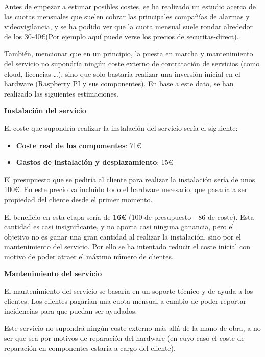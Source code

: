 Antes de empezar a estimar posibles costes, se ha realizado un estudio acerca de las cuotas mensuales que suelen cobrar las principales compañías de alarmas y videovigilancia, y se ha podido ver que la cuota mensual suele rondar alrededor de los 30-40\euro (Por ejemplo aquí puede verse los \href{https://www.comparaiso.es/alarmas/empresas-seguridad/securitas-direct/precio}{precios de securitas-direct}).

También, mencionar que en un principio, la puesta en marcha y mantenimiento del servicio no supondría ningún coste externo de contratación de servicios (como cloud, licencias \ldots), sino que solo bastaría realizar una inversión inicial en el hardware (Raspberry PI y sus componentes). En base a este dato, se han realizado las siguientes estimaciones.

\textbf{Instalación del servicio}

El coste que supondría realizar la instalación del servicio sería el siguiente:

\begin{itemize}
\item \textbf{Coste real de los componentes}: 71\euro

\item \textbf{Gastos de instalación y desplazamiento}: 15\euro

\end{itemize}

\vspace{-0.4cm}

El presupuesto que se pediría al cliente para realizar la instalación sería de unos 100\euro. En este precio va incluido todo el hardware necesario, que pasaría a ser propiedad del cliente desde el primer momento.

El beneficio en esta etapa sería de \textbf{16\euro} (100 de presupuesto - 86 de coste). Esta cantidad es casi insignificante, y no aporta casi ninguna ganancia, pero el objetivo no es ganar una gran cantidad al realizar la instalación, sino por el mantenimiento del servicio. Por ello se ha intentado reducir el coste inicial con motivo de poder atraer el máximo número de clientes.

\textbf{Mantenimiento del servicio}

El mantenimiento del servicio se basaría en un soporte técnico y de ayuda a los clientes. Los clientes pagarían una cuota mensual a cambio de poder reportar incidencias para que puedan ser ayudados.

Este servicio no supondrá ningún coste externo más allá de la mano de obra, a no ser que sea por motivos de reparación del hardware (en cuyo caso el coste de reparación en componentes estaría a cargo del cliente).

